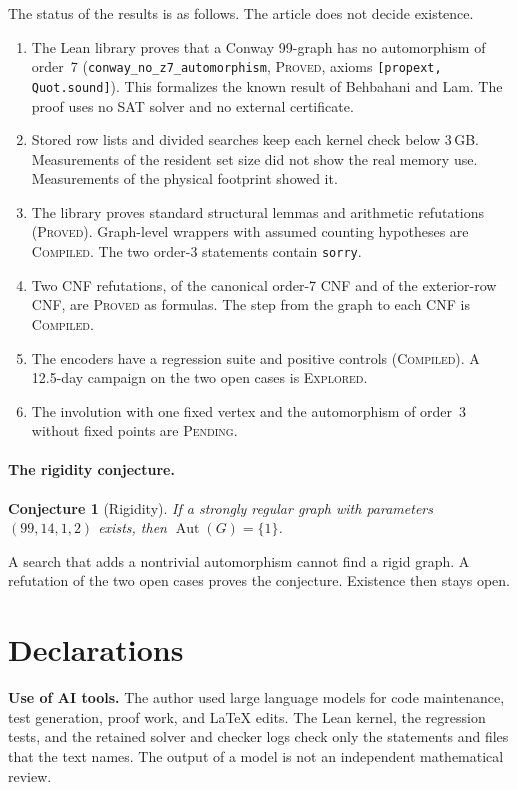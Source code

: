 \documentclass{article}
\theoremstyle{plain}
\newtheorem{conjecture}[theorem]{Conjecture}
\theoremstyle{definition}
\DeclareMathOperator{\Aut}{Aut}
\numberwithin{equation}{section}
\begin{document}
The status of the results is as follows. The article does not decide existence.
\begin{enumerate}
 \item The Lean library proves that a Conway 99-graph has no automorphism of order~7 (\texttt{conway\_no\_z7\_automorphism}, \textsc{Proved}, axioms \texttt{[propext, Quot.sound]}). This formalizes the known result of Behbahani and Lam. The proof uses no SAT solver and no external certificate.
 \item Stored row lists and divided searches keep each kernel check below 3\,GB. Measurements of the resident set size did not show the real memory use. Measurements of the physical footprint showed it.
 \item The library proves standard structural lemmas and arithmetic refutations (\textsc{Proved}). Graph-level wrappers with assumed counting hypotheses are \textsc{Compiled}. The two order-3 statements contain \texttt{sorry}.
 \item Two CNF refutations, of the canonical order-7 CNF and of the exterior-row CNF, are \textsc{Proved} as formulas. The step from the graph to each CNF is \textsc{Compiled}.
 \item The encoders have a regression suite and positive controls (\textsc{Compiled}). A 12.5-day campaign on the two open cases is \textsc{Explored}.
 \item The involution with one fixed vertex and the automorphism of order~3 without fixed points are \textsc{Pending}.
\end{enumerate}

\paragraph{The rigidity conjecture.}
\begin{conjecture}[Rigidity]
If a strongly regular graph with parameters $(99, 14, 1, 2)$ exists, then $\Aut(G) = \{1\}$.
\end{conjecture}
A search that adds a nontrivial automorphism cannot find a rigid graph. A refutation of the two open cases proves the conjecture. Existence then stays open.

\section*{Declarations}

\noindent\textbf{Use of AI tools.} The author used large language models for code maintenance, test generation, proof work, and LaTeX edits. The Lean kernel, the regression tests, and the retained solver and checker logs check only the statements and files that the text names. The output of a model is not an independent mathematical review.
\end{document}
